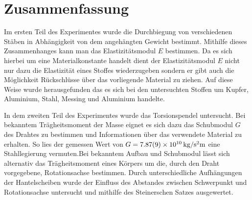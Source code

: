 
\section{Zusammenfassung}
Im ersten Teil des Experimentes wurde die Durchbiegung von verschiedenen Stäben in Abhängigkeit von dem angehängten Gewicht bestimmt. Mithilfe dieses Zusammenhanges kann man das Elastizitätsmodul $E$ bestimmen. Da es sich hierbei um eine Materialkonstante handelt dient der Elastizitätsmodul $E$ nicht nur dazu die Elastizität eines Stoffes wiederzugeben sondern er gibt auch die Möglichkeit Rückschlüsse über das vorliegende Material zu ziehen.
Auf diese Weise wurde herausgefunden das es sich bei den untersuchten Stoffen um Kupfer, Aluminium, Stahl, Messing und Aluminium handelte.

In dem zweiten Teil des Experimentes wurde das Torsionspendel untersucht. Bei bekanntem Trägheitsmoment der Masse eignet es sich dazu das Schubmodul $G$ des Drahtes zu bestimmen und Informationen über das verwendete Material zu erhalten. So lies der gemessen Wert von $G=\SI{7.87+-0.09e10}{kg \per \second \squared  \metre}$ eine Stahllegierung vermuten.Bei bekanntem Aufbau und Schubmodul lässt sich alternativ das Trägheitsmoment eines Körpers um die, durch den Draht vorgegebene, Rotationsachse bestimmen. Durch unterschiedliche Aufhängungen der Hantelscheiben wurde der Einfluss des Abstandes zwischen Schwerpunkt und Rotationsachse untersucht und mithilfe des Steinerschen Satzes ausgewertet.